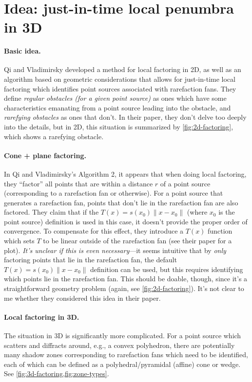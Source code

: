 \documentclass{article}
\begin{document}
\section*{Idea: just-in-time local penumbra in 3D}

\paragraph{Basic idea.} Qi and Vladimirsky developed a method for
local factoring in 2D, as well as an algorithm based on geometric
considerations that allows for just-in-time local factoring which
identifies point sources associated with rarefaction fans. They define
\emph{regular obstacles (for a given point source)} as ones which have
some characteristics emanating from a point source leading into the
obstacle, and \emph{rarefying obstacles} as ones that don't. In their
paper, they don't delve too deeply into the details, but in 2D, this
situation is summarized by \cref{fig:2d-factoring}, which shows a
rarefying obstacle.

\paragraph{Cone + plane factoring.} In Qi and Vladimirsky's Algorithm
2, it appears that when doing local factoring, they ``factor'' all
points that are within a distance $r$ of a point source (corresponding
to a rarefaction fan or otherwise). For a point source that generates
a rarefaction fan, points that don't lie in the rarefaction fan are
also factored. They claim that if the $T(x) = s(x_0) \|x - x_0\|$
(where $x_0$ is the point source) definition is used in this case, it
doesn't provide the proper order of convergence. To compensate for
this effect, they introduce a $T(x)$ function which sets $T$ to be
linear outside of the rarefaction fan (see their paper for a
plot). \emph{It's unclear if this is even necessary}---it seems
intuitive that by \emph{only} factoring points that lie in the
rarefaction fan, the default $T(x) = s(x_0)\|x - x_0\|$ definition can
be used, but this requires identifying which points lie in the
rarefaction fan. This should be doable, though, since it's a
straightforward geometry problem (again, see
\cref{fig:2d-factoring}). It's not clear to me whether they considered
this idea in their paper.

\paragraph{Local factoring in 3D.} The situation in 3D is
significantly more complicated. For a point source which scatters and
diffracts around, e.g., a convex polyhedron, there are potentially
many shadow zones corresponding to rarefaction fans which need to be
identified, each of which can be defined as a polyhedral/pyramidal
(affine) cone or wedge. See \cref{fig:3d-factoring,fig:zone-types}.
\end{document}
